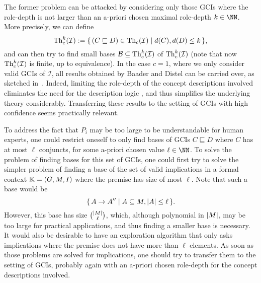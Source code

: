 The former problem can be attacked by considering only those GCIs where the role-depth is
not larger than an a-priori chosen maximal role-depth $k \in \NN$.  More precisely, we can
define
\begin{equation*}
  \operatorname{Th}_{c}^{k}(\mathcal{I}) := {\{\, (C \sqsubseteq D) \in \operatorname{Th}_{c}(\mathcal{I}) \mid d(C), d(D)
    \leq k \,\}},
\end{equation*}
and can then try to find small bases $\mathcal{B} \subseteq \operatorname{Th}_{c}^{k}(\mathcal{I})$ of
$\operatorname{Th}_{c}^{k}(\mathcal{I})$ (note that now $\operatorname{Th}_{c}^{k}(\mathcal{I})$ is finite, up to
equivalence).  In the case $c = 1$, where we only consider valid GCIs of $\mathcal{I}$,
all results obtained by Baader and Distel can be carried over, as sketched
in~\cite{FCA-and-Logics}.  Indeed, limiting the role-depth of the concept descriptions
involved eliminates the need for the description logic \ELgfpbot, and thus simplifies the
underlying theory considerably.  Transferring these results to the setting of GCIs with
high confidence seems practically relevant.

To address the fact that $P_{i}$ may be too large to be understandable for human experts,
one could restrict oneself to only find bases of GCIs $C \sqsubseteq D$ where $C$ has at
most $\ell$ conjuncts, for some a-priori chosen value $\ell \in \NN$.  To solve the
problem of finding bases for this set of GCIs, one could first try to solve the simpler
problem of finding a base of the set of valid implications in a formal context ${\mathbb{K}} =
(G, M, I)$ where the premise has size of most $\ell$.  Note that such a base would be
\begin{equation*}
  {\ensuremath{\{\, A \to A'' \mid A \subseteq M, \lvert A\rvert \leq \ell \,\}}}.
\end{equation*}
However, this base has size $\binom{\lvert M\rvert}{\ell}$, which, although polynomial in $\lvert M\rvert$, may be too large for practical applications, and thus finding a smaller base is
necessary.  It would also be desirable to have an exploration algorithm that only asks
implications where the premise does not have more than $\ell$ elements.  As soon as those
problems are solved for implications, one should try to transfer them to the setting of
GCIs, probably again with an a-priori chosen role-depth for the concept descriptions
involved.


